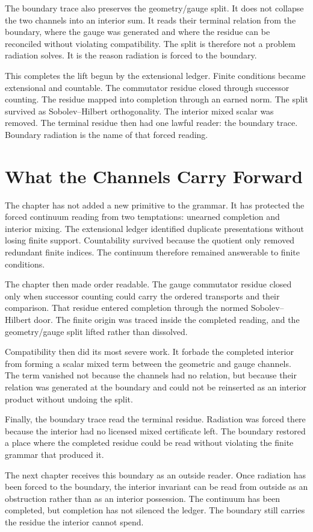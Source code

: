 The boundary trace also preserves the geometry/gauge split. It does not
collapse the two channels into an interior sum. It reads their terminal
relation from the boundary, where the gauge was generated and where the
residue can be reconciled without violating compatibility. The split is
therefore not a problem radiation solves. It is the reason radiation is
forced to the boundary.

This completes the lift begun by the extensional ledger. Finite conditions
became extensional and countable. The commutator residue closed through
successor counting. The residue mapped into completion through an earned
norm. The split survived as Sobolev--Hilbert orthogonality. The interior
mixed scalar was removed. The terminal residue then had one lawful reader:
the boundary trace. Boundary radiation is the name of that forced reading.

\section{What the Channels Carry Forward}

The chapter has not added a new primitive to the grammar. It has protected
the forced continuum reading from two temptations: unearned completion and
interior mixing. The extensional ledger identified duplicate presentations
without losing finite support. Countability survived because the quotient
only removed redundant finite indices. The continuum therefore remained
answerable to finite conditions.

The chapter then made order readable. The gauge commutator residue closed
only when successor counting could carry the ordered transports and their
comparison. That residue entered completion through the normed
Sobolev--Hilbert door. The finite origin was traced inside the completed
reading, and the geometry/gauge split lifted rather than dissolved.

Compatibility then did its most severe work. It forbade the completed
interior from forming a scalar mixed term between the geometric and gauge
channels. The term vanished not because the channels had no relation, but
because their relation was generated at the boundary and could not be
reinserted as an interior product without undoing the split.

Finally, the boundary trace read the terminal residue. Radiation was forced
there because the interior had no licensed mixed certificate left. The
boundary restored a place where the completed residue could be read without
violating the finite grammar that produced it.

The next chapter receives this boundary as an outside reader. Once radiation
has been forced to the boundary, the interior invariant can be read from
outside as an obstruction rather than as an interior possession. The
continuum has been completed, but completion has not silenced the ledger.
The boundary still carries the residue the interior cannot spend.

